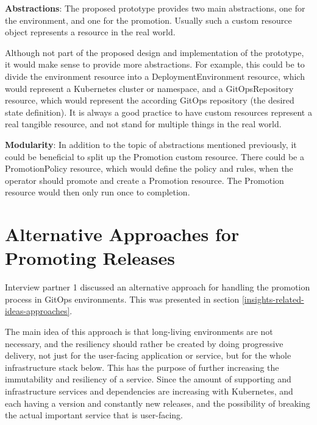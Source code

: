 \textbf{Abstractions}:
The proposed prototype provides two main abstractions,
one for the environment,
and one for the promotion.
Usually such a custom resource object represents a resource in the real world.

Although not part of the proposed design and implementation of the prototype,
it would make sense to provide more abstractions.
For example, this could be to divide the environment resource into
a DeploymentEnvironment resource, which would represent a Kubernetes cluster or namespace,
and a GitOpsRepository resource, which would represent the according GitOps repository (the desired state definition).
It is always a good practice to have custom resources represent a real tangible resource,
and not stand for multiple things in the real world.

\textbf{Modularity}:
In addition to the topic of abstractions mentioned previously,
it could be beneficial to split up the Promotion custom resource.
There could be a PromotionPolicy resource,
which would define the policy and rules,
when the operator should promote and create a Promotion resource.
The Promotion resource would then only run once to completion.














\section{Alternative Approaches for Promoting Releases}

Interview partner 1 discussed an alternative approach for handling the promotion process in GitOps environments.
This was presented in section \ref{insights-related-ideas-approaches}.

The main idea of this approach is that long-living environments are not necessary,
and the resiliency should rather be created by doing progressive delivery,
not just for the user-facing application or service,
but for the whole infrastructure stack below.
This has the purpose of further increasing the immutability and resiliency of a service.
Since the amount of supporting and infrastructure services and dependencies are increasing with Kubernetes,
and each having a version and constantly new releases, and the possibility of breaking the actual important
service that is user-facing.

